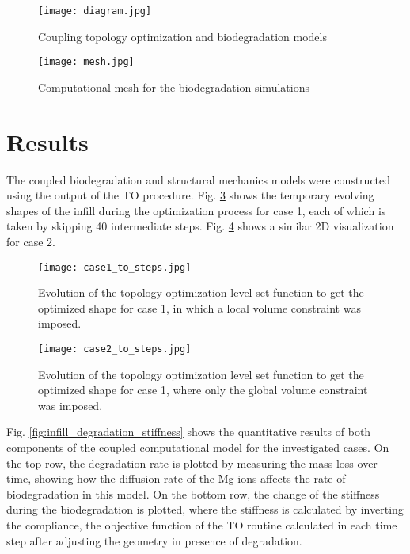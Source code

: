 \begin{figure}[h]
\centering
\medskip
\texttt{[image: diagram.jpg]}
\caption[Coupling topology optimization and biodegradation models]{Coupling topology optimization and biodegradation models} \label{fig:infill_diagram}
\end{figure}


\begin{figure}[h]
\centering
\medskip
\texttt{[image: mesh.jpg]}
\caption[Computational mesh for the biodegradation simulations]{Computational mesh for the biodegradation simulations} \label{fig:infill_mesh}
\end{figure}



\section{Results}

The coupled biodegradation and structural mechanics models were constructed using the output of the TO procedure. Fig. \ref{fig:infill_case1_to_steps} shows the temporary evolving shapes of the infill during the optimization process for case 1, each of which is taken by skipping 40 intermediate steps. Fig. \ref{fig:infill_case2_to_steps} shows a similar 2D visualization for case 2.


\begin{figure}[h]
\centering
\medskip
\texttt{[image: case1\_to\_steps.jpg]}
\caption[Evolution of the topology optimization level set function for case 1]{Evolution of the topology optimization level set function to get the optimized shape for case 1, in which a local volume constraint was imposed.} \label{fig:infill_case1_to_steps}
\end{figure}

\begin{figure}[h]
\centering
\medskip
\texttt{[image: case2\_to\_steps.jpg]}
\caption[Evolution of the topology optimization level set function for case 2]{Evolution of the topology optimization level set function to get the optimized shape for case 1, where only the global volume constraint was imposed.} \label{fig:infill_case2_to_steps}
\end{figure}

Fig. \ref{fig:infill_degradation_stiffness} shows the quantitative results of both components of the coupled computational model for the investigated cases. On the top row, the degradation rate is plotted by measuring the mass loss over time, showing how the diffusion rate of the Mg ions affects the rate of biodegradation in this model. On the bottom row, the change of the stiffness during the biodegradation is plotted, where the stiffness is calculated by inverting the compliance, the objective function of the TO routine calculated in each time step after adjusting the geometry in presence of degradation.



